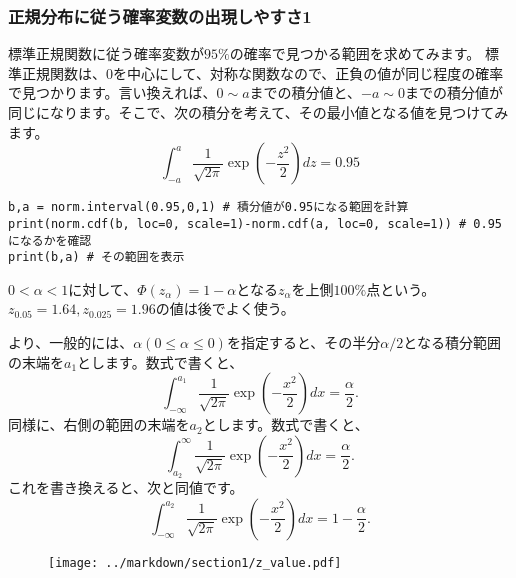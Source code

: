 \documentclass[a4paper,11pt,dvipdfmx]{jsarticle}
\begin{document}
\subsubsection{正規分布に従う確率変数の出現しやすさ1}
標準正規関数に従う確率変数が$95\%$の確率で見つかる範囲を求めてみます。
標準正規関数は、0を中心にして、対称な関数なので、正負の値が同じ程度の確率で見つかります。言い換えれば、$0\sim a$までの積分値と、$-a\sim 0$までの積分値が同じになります。そこで、次の積分を考えて、その最小値となる値を見つけてみます。
\begin{equation}
\int_{-a}^{a} \frac{1}{\sqrt{2\pi}}\exp(-\frac{z^2}{2}) dz = 0.95
\end{equation}

\begin{lstlisting}
b,a = norm.interval(0.95,0,1) # 積分値が0.95になる範囲を計算
print(norm.cdf(b, loc=0, scale=1)-norm.cdf(a, loc=0, scale=1)) # 0.95になるかを確認
print(b,a) # その範囲を表示
\end{lstlisting}


$0<\alpha<1$に対して、$\Phi(z_\alpha) = 1-\alpha$となる$z_\alpha$を上側$100\%$点という。
$z_{0.05}=1.64,z_{0.025}=1.96$の値は後でよく使う。

より、一般的には、$\alpha(0\leq \alpha \leq 0)$を指定すると、その半分$\alpha/2$となる積分範囲の末端を$a_1$とします。数式で書くと、
\begin{equation}
    \int_{-\infty}^{a_1} \frac{1}{\sqrt{2\pi}}\exp(-\frac{x^2}{2})dx = \frac{\alpha}{2}.
\end{equation}
同様に、右側の範囲の末端を$a_2$とします。数式で書くと、
\begin{equation*}
    \int_{a_2}^{\infty} \frac{1}{\sqrt{2\pi}}\exp(-\frac{x^2}{2})dx = \frac{\alpha}{2}.
\end{equation*}
これを書き換えると、次と同値です。
\begin{equation*}
    \int_{-\infty}^{a_2} \frac{1}{\sqrt{2\pi}}\exp(-\frac{x^2}{2})dx = 1-\frac{\alpha}{2}.
\end{equation*}

\begin{figure}
\begin{center}
    \texttt{[image: ../markdown/section1/z\_value.pdf]}
  \end{center}
\end{figure}
\end{document}
